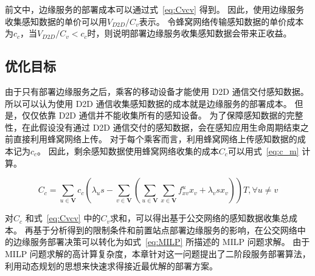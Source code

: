 前文中，边缘服务的部署成本可以通过式~\eqref{eq:Cvcv} 得到。
因此，使用边缘服务收集感知数据的单价可以用$V_{D2D}/C_v$表示。
令蜂窝网络传输感知数据的单价成本为$c_c$，当$V_{D2D}/C_v < c_c$时，则说明部署边缘服务收集感知数据会带来正收益。

\subsection{优化目标}

由于只有部署边缘服务之后，乘客的移动设备才能使用 D2D 通信交付感知数据。
所以可以认为使用 D2D 通信收集感知数据的成本就是边缘服务的部署成本。
但是，仅仅依靠 D2D 通信并不能收集所有的感知设备。
为了保障感知数据的完整性，在此假设没有通过 D2D 通信交付的感知数据，会在感知应用生命周期结束之前直接利用蜂窝网络上传。
对于每个乘客而言，利用蜂窝网络上传感知数据的成本记为$c_c$。
因此，剩余感知数据使用蜂窝网络收集的成本$C_c$可以用式~\eqref{eq:c_m} 计算。

\begin{equation}
\label{eq:c_m}
C_c = \sum_{u\in \boldsymbol{V}}c_c(\lambda_u s - \sum_{v\in \boldsymbol{V}}(\sum_{u\in \boldsymbol{V}}\sum_{x\in \boldsymbol{V}}f^u_{xv} x_v + \lambda_v s x_v))T, \forall u \neq v
\end{equation}

对$C_c$ 和式~\eqref{eq:Cvcv} 中的$C_v$求和，可以得出基于公交网络的感知数据收集总成本。
再基于分析得到的限制条件和前置站点部署边缘服务的影响，在公交网络中的边缘服务部署决策可以转化为如式~\eqref{eq:MILP} 所描述的 MILP 问题求解。
由于 MILP 问题求解的高计算复杂度，本章针对这一问题提出了二阶段服务部署算法，利用动态规划的思想来快速求得接近最优解的部署方案。



